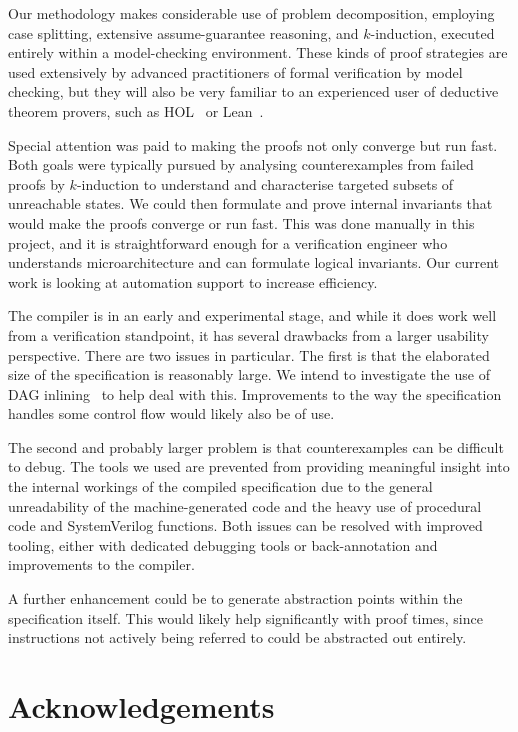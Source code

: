 \documentclass[10pt,conference]{IEEEtran}
\begin{document}
Our methodology makes considerable use of problem decomposition, employing
case splitting, extensive assume-guarantee reasoning, and $k$-induction,
executed entirely within a model-checking environment. These kinds of proof
strategies are used extensively by advanced practitioners of formal
verification by model checking, but they will also be very familiar to an
experienced user of deductive theorem provers, such as HOL~\cite{Gordon:1993:ITH} or
Lean~\cite{lean}.

Special attention was paid to making the proofs not only converge but run
fast. Both goals were typically pursued by analysing counterexamples from
failed proofs by $k$-induction to understand and characterise targeted
subsets of unreachable states. We could then formulate and prove internal
invariants that would make the proofs converge or run fast. This was done
manually in this project, and it is straightforward enough for a
verification engineer who understands microarchitecture and can formulate
logical invariants. Our current work is looking at automation support to
increase efficiency.

The compiler is in an early and experimental stage, and while it does work
well from a verification standpoint, it has several drawbacks from a larger
usability perspective. There are two issues in particular.  The first is
that the elaborated size of the specification is reasonably large. We intend to
investigate the use of DAG inlining~\cite{dag-inlining} to help deal with this.
Improvements to the way the specification handles some control flow would likely
also be of use.

The second and probably larger problem is that counterexamples can be
difficult to debug. The tools we used are prevented from providing
meaningful insight into the internal workings of the compiled specification
due to the general unreadability of the machine-generated code and the
heavy use of procedural code and SystemVerilog functions.  Both issues can
be resolved with improved tooling, either with dedicated debugging tools or
back-annotation and improvements to the compiler.

A further enhancement could be to generate abstraction points within the
specification itself. This would likely help significantly with proof
times, since instructions not actively being referred to could be
abstracted out entirely.

\section{Acknowledgements}
\end{document}
